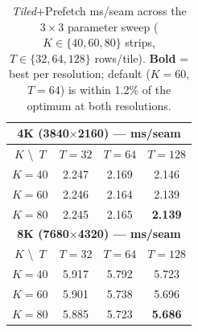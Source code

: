 \begin{table}[h!]
\caption{\emph{Tiled}+Prefetch ms/seam across the $3{\times}3$ parameter sweep
($K{\in}\{40,60,80\}$ strips, $T{\in}\{32,64,128\}$ rows/tile).
\textbf{Bold} = best per resolution; default ($K{=}60$, $T{=}64$) is within
1.2\% of the optimum at both resolutions.}
\label{tab:tilesweep}
\centering
\begin{tabular}{@{}cccc@{}}
\toprule
\multicolumn{4}{c}{\textbf{4K (3840$\times$2160) — ms/seam}} \\
\midrule
$K$ \textbackslash\ $T$ & $T{=}32$ & $T{=}64$ & $T{=}128$ \\
\midrule
$K{=}40$ & 2.247 & 2.169 & 2.146 \\
$K{=}60$ & 2.246 & 2.164 & 2.139 \\
$K{=}80$ & 2.245 & 2.165 & \textbf{2.139} \\
\midrule
\multicolumn{4}{c}{\textbf{8K (7680$\times$4320) — ms/seam}} \\
\midrule
$K$ \textbackslash\ $T$ & $T{=}32$ & $T{=}64$ & $T{=}128$ \\
\midrule
$K{=}40$ & 5.917 & 5.792 & 5.723 \\
$K{=}60$ & 5.901 & 5.738 & 5.696 \\
$K{=}80$ & 5.885 & 5.723 & \textbf{5.686} \\
\bottomrule
\end{tabular}
\end{table}
